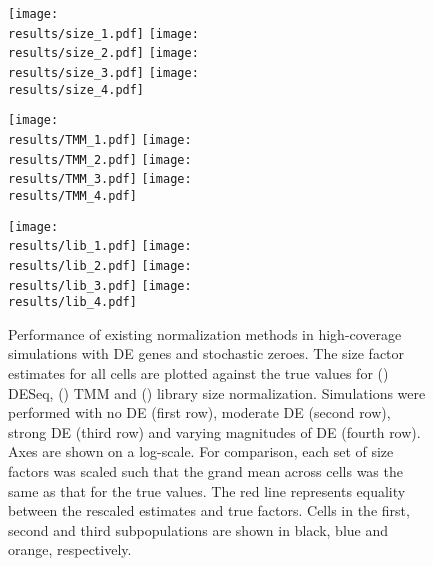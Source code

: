 \documentclass{article}
\begin{document}
\newcommand{\results}{../simulations/results_mid}

\begin{figure}[btp]
\begin{minipage}{0.33\textwidth}
\texttt{[image: \\results/size\_1.pdf]}
\texttt{[image: \\results/size\_2.pdf]}
\texttt{[image: \\results/size\_3.pdf]}
\texttt{[image: \\results/size\_4.pdf]}
\subcaption{}\label{subfig:sizehighcov}
\end{minipage}
\begin{minipage}{0.33\textwidth}
\texttt{[image: \\results/TMM\_1.pdf]}
\texttt{[image: \\results/TMM\_2.pdf]}
\texttt{[image: \\results/TMM\_3.pdf]}
\texttt{[image: \\results/TMM\_4.pdf]}
\subcaption{}\label{subfig:tmmhighcov}
\end{minipage}
\begin{minipage}{0.33\textwidth}
\texttt{[image: \\results/lib\_1.pdf]}
\texttt{[image: \\results/lib\_2.pdf]}
\texttt{[image: \\results/lib\_3.pdf]}
\texttt{[image: \\results/lib\_4.pdf]}
\subcaption{}\label{subfig:libhighcov}
\end{minipage}
\caption{
    Performance of existing normalization methods in high-coverage simulations with DE genes and stochastic zeroes.
    The size factor estimates for all cells are plotted against the true values for () DESeq, () TMM and () library size normalization.
    Simulations were performed with no DE (first row), moderate DE (second row), strong DE (third row) and varying magnitudes of DE (fourth row).
    Axes are shown on a log-scale.
    For comparison, each set of size factors was scaled such that the grand mean across cells was the same as that for the true values.
    The red line represents equality between the rescaled estimates and true factors.
    Cells in the first, second and third subpopulations are shown in black, blue and orange, respectively.
}
\label{fig:highcovexisting}
\end{figure}
\end{document}
